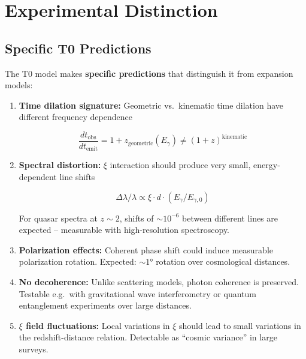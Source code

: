 \section{Experimental Distinction}

\subsection{Specific T0 Predictions}

The T0 model makes \textbf{specific predictions} that distinguish it from 
expansion models:

\begin{enumerate}
\item \textbf{Time dilation signature:} 
      Geometric vs.\ kinematic time dilation have different frequency 
      dependence
      
      \begin{equation}
      \frac{dt_{\text{obs}}}{dt_{\text{emit}}} = 1 + z_{\text{geometric}}(E_\gamma) 
      \neq (1+z)^{\text{kinematic}}
      \label{eq:time_dilation_t0}
      \end{equation}

\item \textbf{Spectral distortion:} 
      $\xi$ interaction should produce very small, energy-dependent line 
      shifts
      
      \begin{equation}
      \Delta\lambda / \lambda \propto \xi \cdot d \cdot (E_\gamma / E_{\gamma,0})
      \label{eq:spectral_distortion}
      \end{equation}
      
      For quasar spectra at $z \sim 2$, shifts of $\sim 10^{-6}$ between 
      different lines are expected -- measurable with high-resolution 
      spectroscopy.

\item \textbf{Polarization effects:} 
      Coherent phase shift could induce measurable polarization rotation. 
      Expected: $\sim 1°$ rotation over cosmological distances.

\item \textbf{No decoherence:} 
      Unlike scattering models, photon coherence is preserved. Testable 
      e.g.\ with gravitational wave interferometry or quantum entanglement 
      experiments over large distances.

\item \textbf{$\xi$ field fluctuations:} 
      Local variations in $\xi$ should lead to small variations in the 
      redshift-distance relation. Detectable as ``cosmic variance'' in 
      large surveys.
\end{enumerate}

